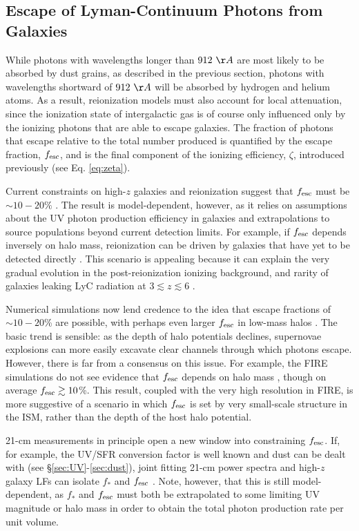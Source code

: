 \subsection{Escape of Lyman-Continuum Photons from Galaxies} \label{sec:fesc}
While photons with wavelengths longer than $912 \ \AA$ are most likely to be absorbed by dust grains, as described in the previous section, photons with wavelengths shortward of $912 \ \AA$ will be absorbed by hydrogen and helium atoms. As a result, reionization models must also account for local attenuation, since the ionization state of intergalactic gas is of course only influenced only by the ionizing photons that are able to escape galaxies. The fraction of photons that escape relative to the total number produced is quantified by the escape fraction, $f_{\text{esc}}$, and is the final component of the ionizing efficiency, $\zeta$, introduced previously (see Eq. \ref{eq:zeta}).

Current constraints on high-$z$ galaxies and reionization suggest that $f_{\text{esc}}$ must be $\sim 10-20\%$ \cite{Robertson2015}. The result is model-dependent, however, as it relies on assumptions about the UV photon production efficiency in galaxies and extrapolations to source populations beyond current detection limits. For example, if $f_{\text{esc}}$ depends inversely on halo mass, reionization can be driven by galaxies that have yet to be detected directly \cite{Finkelstein2018}. This scenario is appealing because it can explain the very gradual evolution in the post-reionization ionizing background, and rarity of galaxies leaking LyC radiation at $3 \lesssim z \lesssim 6$ \cite{Shapley2006}.

Numerical simulations now lend credence to the idea that escape fractions of $\sim 10-20$\% are possible, with perhaps even larger $f_{\text{esc}}$ in low-mass halos \cite{Kimm2014}. The basic trend is sensible: as the depth of halo potentials declines, supernovae explosions can more easily excavate clear channels through which photons escape. However, there is far from a consensus on this issue. For example, the \textsc{FIRE} simulations do not see evidence that $f_{\text{esc}}$ depends on halo mass \cite{Ma2015}, though on average $f_{\text{esc}} \gtrsim 10$\%. This result, coupled with the very high resolution in \textsc{FIRE}, is more suggestive of a scenario in which $f_{\text{esc}}$ is set by very small-scale structure in the ISM, rather than the depth of the host halo potential.

21-cm measurements in principle open a new window into constraining $f_{\text{esc}}$. If, for example, the UV/SFR conversion factor is well known and dust can be dealt with (see \S\ref{sec:UV}-\ref{sec:dust}), joint fitting 21-cm power spectra and high-$z$ galaxy LFs can isolate $f_{\ast}$ and $f_{\text{esc}}$ \cite{Park2019,Greig2019}. Note, however, that this is still model-dependent, as $f_{\ast}$ and $f_{\text{esc}}$ must both be extrapolated to some limiting UV magnitude or halo mass in order to obtain the total photon production rate per unit volume. 

